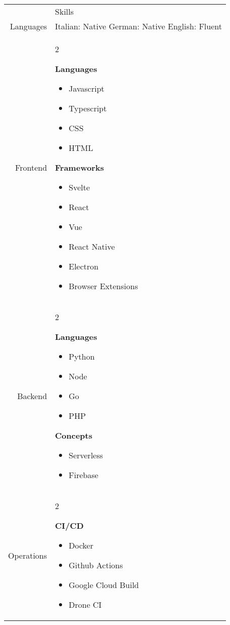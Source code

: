 \documentclass[letterpaper,12pt]{article}
\newcommand{\headingfont}{\Large\color{OliveGreen}\BluuNext}
\newenvironment{compactlist}{
  \begin{itemize}[noitemsep,nolistsep,partopsep=-20pt,topsep=-20pt,leftmargin=0pt, label=--]
      }{
  \end{itemize}
}
\newenvironment{lr}{
  \setlength\multicolsep{-1.7em}
  \begin{multicols}{2}
}{
  \end{multicols}
}
\newenvironment{SectionTable}[1]{
	\renewcommand*{\arraystretch}{1.7}
	\setlength{\tabcolsep}{10pt}
	\begin{longtable}{Rp{5.2in}} & #1 \\}
{\end{longtable}\vspace{-.3cm}}
\begin{document}
\begin{SectionTable}{\headingfont Skills}

  Languages &
  Italian: Native \newline
  German: Native \newline
  English: Fluent \newline
  \\

  Frontend &
  \begin{lr}
    \textbf{Languages}
    \begin{compactlist}
      \item Javascript
      \item Typescript
      \item CSS
      \item HTML
    \end{compactlist}

    \columnbreak

    \textbf{Frameworks}
    \begin{compactlist}
      \item Svelte
      \item React
      \item Vue
      \item React Native
      \item Electron
      \item Browser Extensions
    \end{compactlist}
  \end{lr}
  \\

  Backend &
  \begin{lr}
    \textbf{Languages}
    \begin{compactlist}
      \item Python
      \item Node
      \item Go
      \item PHP
    \end{compactlist}
    \columnbreak
    \textbf{Concepts}
    \begin{compactlist}
      \item Serverless
      \item Firebase
    \end{compactlist}
  \end{lr}
  \\

  Operations &
  \begin{lr}
    \textbf{CI/CD}
    \begin{compactlist}
      \item Docker
      \item Github Actions
      \item Google Cloud Build
      \item Drone CI
    \end{compactlist}


\end{lr}
\end{SectionTable}
\end{document}
